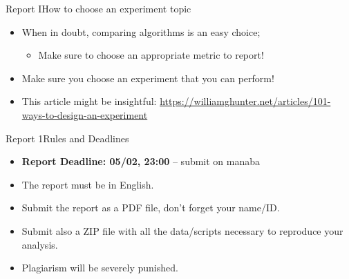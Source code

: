 \documentclass[aspectratio=169]{beamer}
\begin{document}
\begin{CJK}{UTF8}{ipxm}
\begin{frame}{Report I}{How to choose an experiment topic}
\begin{itemize}
    \item When in doubt, comparing algorithms is an easy choice;
    \begin{itemize}
      \item Make sure to choose an appropriate metric to report!
    \end{itemize}
    \medskip

    \item Make sure you choose an experiment that you can perform!
    \bigskip

    \item This article might be insightful: \url{https://williamghunter.net/articles/101-ways-to-design-an-experiment}
  \end{itemize}
\end{frame}

\begin{frame}{Report 1}{Rules and Deadlines}
  \begin{itemize}
    \item {\bf Report Deadline: 05/02, 23:00} -- submit on manaba\bigskip

    \item The report must be in English.\bigskip

    \item Submit the report as a PDF file, don't forget your name/ID.
    \item Submit also a ZIP file with all the data/scripts necessary to reproduce your analysis.
    \bigskip

    \item Plagiarism will be severely punished.
  \end{itemize}

\end{frame}



\end{CJK}
\end{document}
